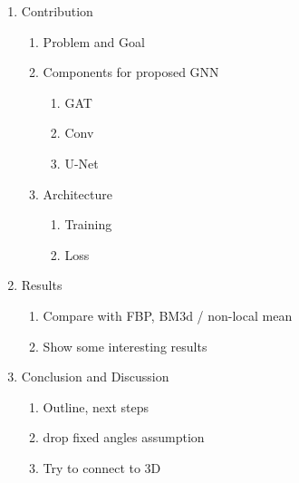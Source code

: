 \begin{enumerate}
    \item Contribution
    \begin{enumerate}
        \item Problem and Goal
        \item Components for proposed GNN
        \begin{enumerate}
            \item GAT
            \item Conv
            \item U-Net
        \end{enumerate}
        \item Architecture
        \begin{enumerate}
            \item Training
            \item Loss
        \end{enumerate}
    \end{enumerate}
    \item Results
    \begin{enumerate}
        \item Compare with FBP, BM3d / non-local mean
        \item Show some interesting results
    \end{enumerate}
    \item Conclusion and Discussion
    \begin{enumerate}
        \item Outline, next steps
        \item drop fixed angles assumption
        \item Try to connect to 3D
    \end{enumerate}
    
\end{enumerate}
